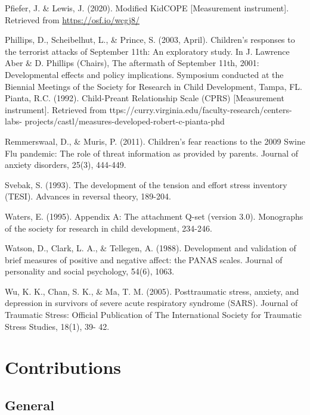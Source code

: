 \documentclass[]{book}
\begin{document}
Pfiefer, J. \& Lewis, J. (2020). Modified KidCOPE {[}Measurement instrument{]}. Retrieved from
\url{https://osf.io/wcgj8/}

Phillips, D., Scheibelhut, L., \& Prince, S. (2003, April). Children's responses to the terrorist
attacks of September 11th: An exploratory study. In J. Lawrence Aber \& D. Phillips
(Chairs), The aftermath of September 11th, 2001: Developmental effects and policy
implications. Symposium conducted at the Biennial Meetings of the Society for Research
in Child Development, Tampa, FL.
Pianta, R.C. (1992). Child-Preant Relationship Scale (CPRS) {[}Measurement instrument{]}.
Retrieved from ttps://curry.virginia.edu/faculty-research/centers-labs-
projects/castl/measures-developed-robert-c-pianta-phd

Remmerswaal, D., \& Muris, P. (2011). Children's fear reactions to the 2009 Swine Flu
pandemic: The role of threat information as provided by parents. Journal of anxiety
disorders, 25(3), 444-449.

Svebak, S. (1993). The development of the tension and effort stress inventory (TESI). Advances
in reversal theory, 189-204.

Waters, E. (1995). Appendix A: The attachment Q-set (version 3.0). Monographs of the society
for research in child development, 234-246.

Watson, D., Clark, L. A., \& Tellegen, A. (1988). Development and validation of brief measures
of positive and negative affect: the PANAS scales. Journal of personality and social
psychology, 54(6), 1063.

Wu, K. K., Chan, S. K., \& Ma, T. M. (2005). Posttraumatic stress, anxiety, and depression in
survivors of severe acute respiratory syndrome (SARS). Journal of Traumatic Stress:
Official Publication of The International Society for Traumatic Stress Studies, 18(1), 39-
42.

\hypertarget{contributions}{%
\chapter{Contributions}\label{contributions}}

\hypertarget{general}{%
\section{General}\label{general}}
\end{document}
